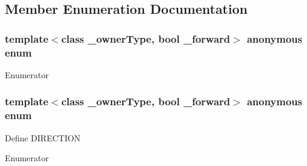 \subsection{Member Enumeration Documentation}
\hypertarget{classvct_var_stride_n_array_const_iterator_af8a3a7bff8c62645957f37e5f0a2cb26}{}\subsubsection[{anonymous enum}]{\setlength{\rightskip}{0pt plus 5cm}template$<$class \+\_\+owner\+Type, bool \+\_\+forward$>$ anonymous enum}\label{classvct_var_stride_n_array_const_iterator_af8a3a7bff8c62645957f37e5f0a2cb26}
\begin{Desc}
\item[Enumerator]\par
\begin{description}
\item[{\em 
\hypertarget{classvct_var_stride_n_array_const_iterator_af8a3a7bff8c62645957f37e5f0a2cb26a66232514960f77bde765de7883b9c9ad}{}D\+I\+M\+E\+N\+S\+I\+O\+N\label{classvct_var_stride_n_array_const_iterator_af8a3a7bff8c62645957f37e5f0a2cb26a66232514960f77bde765de7883b9c9ad}
}]\end{description}
\end{Desc}
\hypertarget{classvct_var_stride_n_array_const_iterator_af0ff516839367c7e5b697e375001ec43}{}\subsubsection[{anonymous enum}]{\setlength{\rightskip}{0pt plus 5cm}template$<$class \+\_\+owner\+Type, bool \+\_\+forward$>$ anonymous enum}\label{classvct_var_stride_n_array_const_iterator_af0ff516839367c7e5b697e375001ec43}
Define D\+I\+R\+E\+C\+T\+I\+O\+N \begin{Desc}
\item[Enumerator]\par
\begin{description}
\item[{\em 
\hypertarget{classvct_var_stride_n_array_const_iterator_af0ff516839367c7e5b697e375001ec43a12bc9e225c77c3bac1de598aa549843b}{}D\+I\+R\+E\+C\+T\+I\+O\+N\label{classvct_var_stride_n_array_const_iterator_af0ff516839367c7e5b697e375001ec43a12bc9e225c77c3bac1de598aa549843b}
}]\end{description}
\end{Desc}


